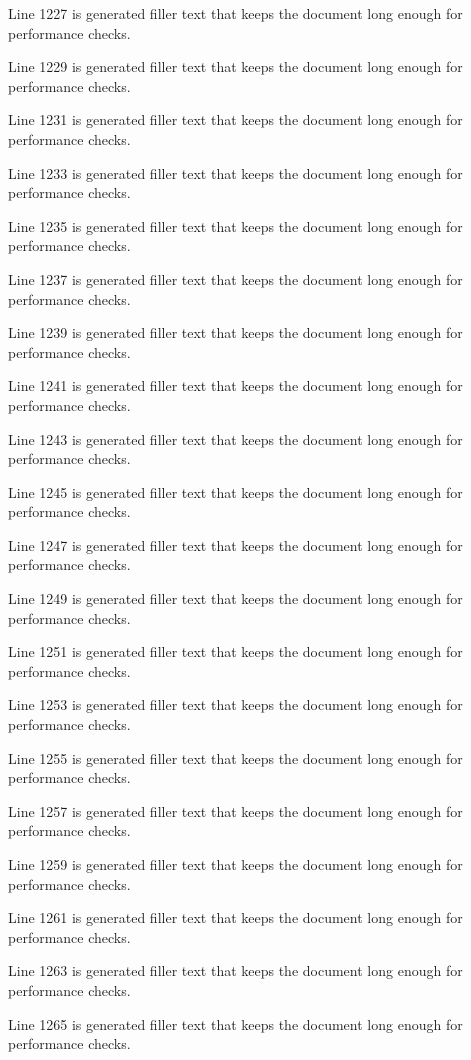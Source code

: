 Line 1227 is generated filler text that keeps the document long enough for performance checks.

Line 1229 is generated filler text that keeps the document long enough for performance checks.

Line 1231 is generated filler text that keeps the document long enough for performance checks.

Line 1233 is generated filler text that keeps the document long enough for performance checks.

Line 1235 is generated filler text that keeps the document long enough for performance checks.

Line 1237 is generated filler text that keeps the document long enough for performance checks.

Line 1239 is generated filler text that keeps the document long enough for performance checks.

Line 1241 is generated filler text that keeps the document long enough for performance checks.

Line 1243 is generated filler text that keeps the document long enough for performance checks.

Line 1245 is generated filler text that keeps the document long enough for performance checks.

Line 1247 is generated filler text that keeps the document long enough for performance checks.

Line 1249 is generated filler text that keeps the document long enough for performance checks.

Line 1251 is generated filler text that keeps the document long enough for performance checks.

Line 1253 is generated filler text that keeps the document long enough for performance checks.

Line 1255 is generated filler text that keeps the document long enough for performance checks.

Line 1257 is generated filler text that keeps the document long enough for performance checks.

Line 1259 is generated filler text that keeps the document long enough for performance checks.

Line 1261 is generated filler text that keeps the document long enough for performance checks.

Line 1263 is generated filler text that keeps the document long enough for performance checks.

Line 1265 is generated filler text that keeps the document long enough for performance checks.


